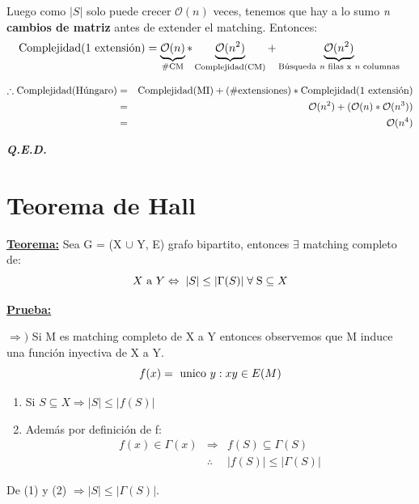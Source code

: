 \documentclass[12pt,a4paper]{report}
\newcommand{\QED}{\hfill \textit{\textbf{Q.E.D.}}}
\begin{document}
\begin{enumerate}
					\par Luego como $\lvert S \rvert$ solo puede crecer $\mathcal{O}(n)$ veces, tenemos que hay a lo sumo \textit{n} \textbf{cambios de matriz} antes de extender el matching. Entonces:
						\[
							\textup{Complejidad(1 extensión)} = \underbrace{\mathcal{O}(n)}_{\# \textup{CM}} * \underbrace{\mathcal{O}(n^{2})}_{\textup{Complejidad(CM)}} + \underbrace{\mathcal{O}(n^{2})}_{\textup{Búsqueda \textit{n} filas x \textit{n} columnas}} \\
						\]

					\vspace{5mm}
					\begin{eqnarray}
						\nonumber \therefore \textup{Complejidad(Húngaro)} &=& \textup{Complejidad(MI)} + (\# \textup{extensiones}) * \textup{Complejidad(1 extensión)} \\
						\nonumber &=& \mathcal{O}(n^{2}) + (\mathcal{O}(n) * \mathcal{O}(n^{3})) \\
						\nonumber &=& \mathcal{O}(n^{4})
					\end{eqnarray}
			\end{enumerate}

		\QED
	
	\section{Teorema de Hall}
		\textbf{\underline{Teorema:}} Sea G = (X $\cup$ Y, E) grafo bipartito, entonces $\exists$ matching completo de:
		\[
			X \textup{ a } Y \Leftrightarrow \; \lvert S \rvert \leq \lvert \Gamma(S) \rvert \; \forall \; \textup{S} \subseteq X
		\]

		\vspace{3mm}
		\textbf{\underline{Prueba:}}
			\par $\Rightarrow)$ Si M es matching completo de X a Y entonces observemos que M induce una función inyectiva de X a Y.
			\[ f(x) = \textup{ unico } y : xy \in E(M) \]

			\begin{enumerate}
				\item Si $S \subseteq X \Rightarrow \lvert S \rvert \leq \lvert f(S) \rvert$
				\item Además por definición de f: 
					\begin{eqnarray}
						\nonumber f(x) \in \Gamma(x) &\Rightarrow & f(S) \subseteq \Gamma(S) \\
						\nonumber &\therefore & \lvert f(S) \rvert \leq \lvert \Gamma(S) \rvert
					\end{eqnarray}
			\end{enumerate}
			\par De (1) y (2) $\Rightarrow \lvert S \rvert \leq \lvert \Gamma(S) \rvert$.
\end{document}
